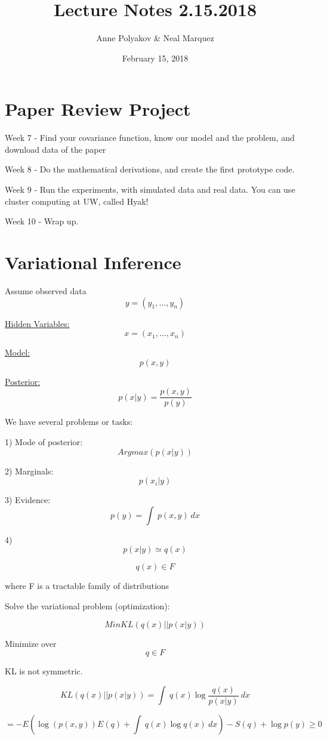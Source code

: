 \documentclass{article}
\begin{document}
\title{Lecture Notes 2.15.2018}
\author{Anne Polyakov \& Neal Marquez}
\date{February 15, 2018}
\maketitle

\section{Paper Review Project}


Week 7 - Find your covariance function, know our model and the problem, and download data of the paper

Week 8 - Do the mathematical derivations, and create the first prototype code.

Week 9 - Run the experiments, with simulated data and real data. You can use cluster computing at UW, called Hyak!


Week 10 - Wrap up.


\section{Variational Inference}

Assume observed data \[y = (y_1, ..., y_n)\]

\underline{Hidden Variables:} \[x = (x_1, ..., x_n)\]

\underline{Model:} \[ p(x,y) \]

\underline{Posterior:} \[p(x|y) = \frac{p(x,y)}{p(y)}\]



We have several problems or tasks:

1) Mode of posterior: \[Argmax(p(x|y))\]

2) Marginals: \[p(x_i|y)\]

3) Evidence: \[p(y) =  \int\ p(x,y) \ dx \]

4) \[p(x|y) \simeq q(x) \]

\[
q(x) \in F
\]

where F is a tractable family of distributions

Solve the variational problem (optimization):

\[ Min KL(q(x) || p(x|y)) \]

Minimize over \[q \in F \]

KL is not symmetric.

\[KL(q(x)||p(x|y)) = \int\ q(x) \log \frac{q(x)}{p(x|y)} \ dx \]

\[= -E( \log (p(x,y))  E(q) + \int\ q(x) \log q(x) \ dx) - S(q) + \log p(y) \geq 0  \]
\end{document}
